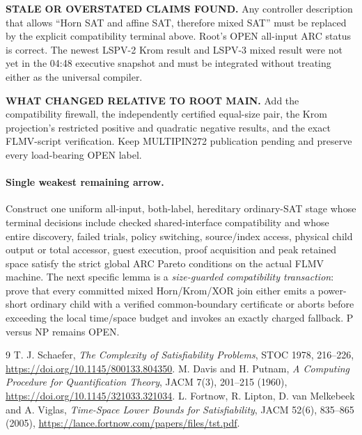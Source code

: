 \documentclass[11pt]{article}
\begin{document}
\textbf{STALE OR OVERSTATED CLAIMS FOUND.} Any controller description that
allows ``Horn SAT and affine SAT, therefore mixed SAT'' must be replaced by the
explicit compatibility terminal above.  Root's OPEN all-input ARC status is
correct.  The newest LSPV-2 Krom result and LSPV-3 mixed result were not yet in
the 04:48 executive snapshot and must be integrated without treating either as
the universal compiler.

\textbf{WHAT CHANGED RELATIVE TO ROOT MAIN.} Add the compatibility firewall,
the independently certified equal-size pair, the Krom projection's restricted
positive and quadratic negative results, and the exact FLMV-script verification.
Keep MULTIPIN272 publication pending and preserve every load-bearing OPEN label.

\paragraph{Single weakest remaining arrow.}
Construct one uniform all-input, both-label, hereditary ordinary-SAT stage whose
terminal decisions include checked shared-interface compatibility and whose
entire discovery, failed trials, policy switching, source/index access, physical
child output or total accessor, guest execution, proof acquisition and peak
retained space satisfy the strict global ARC Pareto conditions on the actual
FLMV machine.  The next specific lemma is a \emph{size-guarded compatibility
transaction}: prove that every committed mixed Horn/Krom/XOR join either emits
a power-short ordinary child with a verified common-boundary certificate or
aborts before exceeding the local time/space budget and invokes an exactly
charged fallback.  P versus NP remains OPEN.

\begin{thebibliography}{9}
 T. J. Schaefer, \emph{The Complexity of Satisfiability
Problems}, STOC 1978, 216--226, \url{https://doi.org/10.1145/800133.804350}.
 M. Davis and H. Putnam, \emph{A Computing Procedure for
Quantification Theory}, JACM 7(3), 201--215 (1960),
\url{https://doi.org/10.1145/321033.321034}.
 L. Fortnow, R. Lipton, D. van Melkebeek and A. Viglas,
\emph{Time-Space Lower Bounds for Satisfiability}, JACM 52(6), 835--865
(2005), \url{https://lance.fortnow.com/papers/files/tst.pdf}.
\end{thebibliography}
\end{document}
